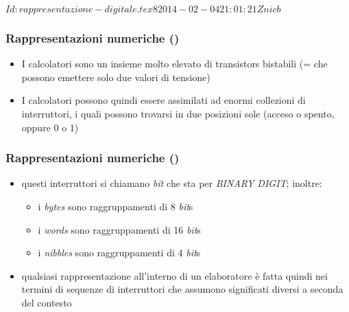 %
%
%
%
%
\svnInfo $Id: rappresentazione-digitale.tex 8 2014-02-04 21:01:21Z nicb $

\setcounter{ms}{1}
\begin{frame}
    \frametitle{Rappresentazioni numeriche ()}

	\begin{itemize}[<+- | alert@+->]

		\item I calcolatori sono un insieme molto elevato di transistors
			bistabili (= che possono emettere solo due valori di tensione)

		\item I calcolatori possono quindi essere assimilati ad
			enormi collezioni di interruttori,
			i quali possono trovarsi in due posizioni sole
			(acceso o spento, oppure 0 o 1)

	\end{itemize}

\end{frame}


\begin{frame}
    \frametitle{Rappresentazioni numeriche ()}

	\begin{itemize}[<+- | alert@+->]

		\item questi interruttori si chiamano \emph{bit}
			che sta per \emph{BINARY DIGIT}; inoltre:

		\begin{itemize}[<+- | alert@+->]

			\item i \emph{bytes} sono raggruppamenti di 8 \emph{bit}s
			\item i \emph{words} sono raggruppamenti di 16 \emph{bit}s
			\item i \emph{nibbles} sono raggruppamenti di 4 \emph{bit}s

		\end{itemize}

		\item qualsiasi rappresentazione all'interno di
			un elaboratore \`e fatta quindi nei termini
			di sequenze di interruttori che assumono significati
			diversi a seconda del contesto

	\end{itemize}

\end{frame}

